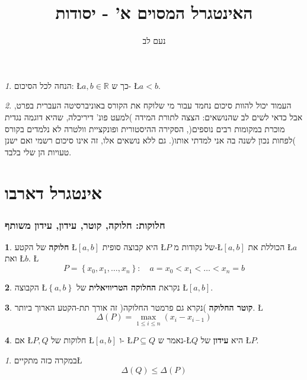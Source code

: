 \documentclass[english,hebrew]{article}
\theoremstyle{remark}
\newtheorem*{rem*}{\protect\remarkname}
\theoremstyle{definition}
\newtheorem*{defn*}{\protect\definitionname}
\theoremstyle{plain}
\theoremstyle{remark}
\newtheorem{claim}[thm]{\protect\claimname}
\theoremstyle{plain}
\theoremstyle{plain}
\theoremstyle{definition}
\theoremstyle{plain}
\providecommand{\claimname}{טענה}
\providecommand{\definitionname}{הגדרה}
\providecommand{\remarkname}{הערה}
\begin{document}
\title{האינטגרל המסוים א' - יסודות}
\author{נעם לב}

\maketitle
\tableofcontents{}

\newpage{}
\begin{rem*}
הנחה לכל הסיכום: \L{$a,b\in\mathbb{R}$} כך ש- \L{$a<b$}.
\end{rem*}
\begin{rem*}
העמוד יכול להוות סיכום נחמד עבור מי שלוקח את הקורס באוניברסיטה העברית
בפרט, אבל כדאי לשים לב שהנושאים: הצצה לתורת המידה )למעט פונ' דיריכלה,
שהיא דוגמה נגדית מוכרת במקומות רבים נוספים(, הסקירה ההיסטורית ופונקציית
וולטרה לא נלמדים בקורס )לפחות נכון לשנה בה אני למדתי אותו(. גם ללא
נושאים אלו, זה אינו סיכום רשמי ואם ישנן טעויות הן שלי בלבד.
\end{rem*}

\part{אינטגרל דארבו}

\section{חלוקות: חלוקה, קוטר, עידון, עידון משותף}
\begin{defn*}
\textbf{חלוקה} של הקטע \L{$\left[a,b\right]$} היא קבוצה סופית \L{$P$}
של נקודות מ-\L{$\left[a,b\right]$} הכוללת את \L{$a$} ואת \L{$b$}.
\L{%
\[
P=\left\{ x_{0},x_{1},\dots,x_{n}\right\} :\quad a=x_{0}<x_{1}<\dots<x_{n}=b
\]
}%
\end{defn*}
\begin{defn*}
הקבוצה \L{$\left\{ a,b\right\} $} נקראת \textbf{החלוקה הטריוויאלית
}של \L{$\left[a,b\right]$}.
\end{defn*}
\begin{defn*}
\textbf{קוטר החלוקה })נקרא גם פרמטר החלוקה( זה אורך תת-הקטע הארוך
ביותר. \L{%
\[
\Delta\left(P\right)=\underset{1\le i\le n}{\max}\left(x_{i}-x_{i-1}\right)
\]
}%
\end{defn*}
\begin{defn*}
אם \L{$P,Q$} חלוקות של \L{$\left[a,b\right]$} ו- \L{$P\subseteq Q$}
נאמר ש-\L{$Q$} היא \textbf{עידון} של \L{$P$}.
\end{defn*}
\begin{claim}
במקרה כזה מתקיים\L{%
\[
\Delta\left(Q\right)\le\Delta\left(P\right)
\]
}%
\end{claim}
\end{document}
